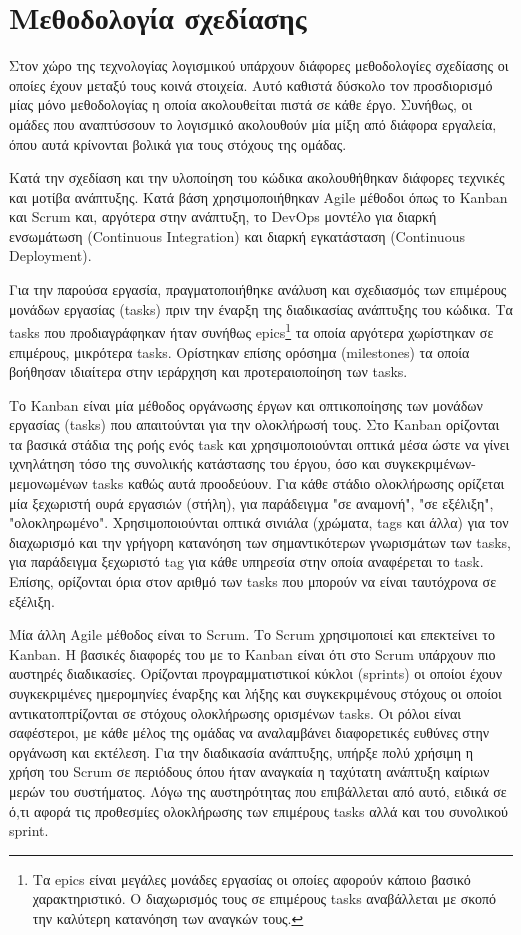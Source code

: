 \section{Μεθοδολογία σχεδίασης} \label{section:3-3-design-methodology}

Στον χώρο της τεχνολογίας λογισμικού υπάρχουν διάφορες μεθοδολογίες σχεδίασης οι οποίες έχουν μεταξύ τους κοινά στοιχεία. Αυτό καθιστά δύσκολο τον προσδιορισμό μίας μόνο μεθοδολογίας η οποία ακολουθείται πιστά σε κάθε έργο. Συνήθως, οι ομάδες που αναπτύσσουν το λογισμικό ακολουθούν μία μίξη από διάφορα εργαλεία, όπου αυτά κρίνονται βολικά για τους στόχους της ομάδας. %

Κατά την σχεδίαση και την υλοποίηση του κώδικα ακολουθήθηκαν διάφορες τεχνικές και μοτίβα ανάπτυξης. Κατά βάση χρησιμοποιήθηκαν Agile μέθοδοι όπως το Kanban και Scrum και, αργότερα στην ανάπτυξη, το DevOps μοντέλο για διαρκή ενσωμάτωση (Continuous Integration) και διαρκή εγκατάσταση (Continuous Deployment).

Για την παρούσα εργασία, πραγματοποιήθηκε ανάλυση και σχεδιασμός των επιμέρους μονάδων εργασίας (tasks) πριν την έναρξη της διαδικασίας ανάπτυξης του κώδικα. Τα tasks που προδιαγράφηκαν ήταν συνήθως epics\footnote{Τα epics είναι μεγάλες μονάδες εργασίας οι οποίες αφορούν κάποιο βασικό χαρακτηριστικό. Ο διαχωρισμός τους σε επιμέρους tasks αναβάλλεται με σκοπό την καλύτερη κατανόηση των αναγκών τους.} τα οποία αργότερα χωρίστηκαν σε επιμέρους, μικρότερα tasks. Ορίστηκαν επίσης ορόσημα (milestones) τα οποία βοήθησαν ιδιαίτερα στην ιεράρχηση και προτεραιοποίηση των tasks.

Το Kanban είναι μία μέθοδος οργάνωσης έργων και οπτικοποίησης των μονάδων εργασίας (tasks) που απαιτούνται για την ολοκλήρωσή τους. Στο Kanban ορίζονται τα βασικά στάδια της ροής ενός task και χρησιμοποιούνται οπτικά μέσα ώστε να γίνει ιχνηλάτηση τόσο της συνολικής κατάστασης του έργου, όσο και συγκεκριμένων-μεμονωμένων tasks καθώς αυτά προοδεύουν. Για κάθε στάδιο ολοκλήρωσης ορίζεται μία ξεχωριστή ουρά εργασιών (στήλη), για παράδειγμα "σε αναμονή", "σε εξέλιξη", "ολοκληρωμένο". Χρησιμοποιούνται οπτικά σινιάλα (χρώματα, tags και άλλα) για τον διαχωρισμό και την γρήγορη κατανόηση των σημαντικότερων γνωρισμάτων των tasks, για παράδειγμα ξεχωριστό tag για κάθε υπηρεσία στην οποία αναφέρεται το task. Επίσης, ορίζονται όρια στον αριθμό των tasks που μπορούν να είναι ταυτόχρονα σε εξέλιξη.

Μία άλλη Agile μέθοδος είναι το Scrum. Το Scrum χρησιμοποιεί και επεκτείνει το Kanban. Η βασικές διαφορές του με το Kanban είναι ότι στο Scrum υπάρχουν πιο αυστηρές διαδικασίες. Ορίζονται προγραμματιστικοί κύκλοι (sprints) οι οποίοι έχουν συγκεκριμένες ημερομηνίες έναρξης και λήξης και συγκεκριμένους στόχους οι οποίοι αντικατοπτρίζονται σε στόχους ολοκλήρωσης ορισμένων tasks. Οι ρόλοι είναι σαφέστεροι, με κάθε μέλος της ομάδας να αναλαμβάνει διαφορετικές ευθύνες στην οργάνωση και εκτέλεση. Για την διαδικασία ανάπτυξης, υπήρξε πολύ χρήσιμη η χρήση του Scrum σε περιόδους όπου ήταν αναγκαία η ταχύτατη ανάπτυξη καίριων μερών του συστήματος. Λόγω της αυστηρότητας που επιβάλλεται από αυτό, ειδικά σε ό,τι αφορά τις προθεσμίες ολοκλήρωσης των επιμέρους tasks αλλά και του συνολικού sprint.

